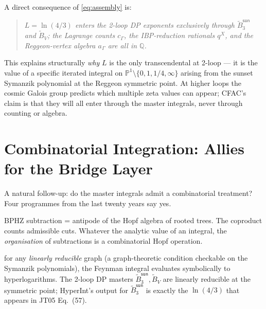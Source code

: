 \documentclass[11pt,a4paper]{article}
\newcommand{\Llog}{\ln(4/3)}
\theoremstyle{definition}
\theoremstyle{plain}
\begin{document}
\begin{cfacbox}[$\Llog$ is in the bridge layer only]
A direct consequence of \eqref{eq:assembly} is:
\begin{quote}
\emph{$L = \Llog$ enters the 2-loop DP exponents
exclusively through $\tilde B_3^{\textsf{sun}}$ and $\tilde B_V$;
the Lagrange counts $c_\Gamma$, the IBP-reduction rationals $q^X$,
and the Reggeon-vertex algebra $a_\Gamma$ are all in $\mathbb{Q}$.}
\end{quote}
This explains structurally \emph{why} $L$ is the only transcendental
at 2-loop --- it is the value of a specific iterated integral
\cite{Panzer2014} on $\mathbb{P}^1\setminus\{0,1,1/4,\infty\}$
arising from the sunset Symanzik polynomial at the Reggeon symmetric
point.  At higher loops the cosmic Galois group \cite{Brown2015}
predicts which multiple zeta values can appear; CFAC's claim is that
they will all enter through the master integrals, never through
counting or algebra.
\end{cfacbox}

\section{Combinatorial Integration: Allies for the Bridge Layer}
\label{sec:combinatorial-integration}

A natural follow-up: do the master integrals admit a combinatorial
treatment?  Four programmes from the last twenty years say yes.

\begin{acbox}
\cite{ConnesKreimer1998,Kreimer1997} BPHZ subtraction = antipode of
the Hopf algebra of rooted trees.  The coproduct counts admissible
cuts.  Whatever the analytic value of an integral, the
\emph{organisation} of subtractions is a combinatorial Hopf
operation.
\end{acbox}

\begin{acbox}
\cite{Panzer2014,Panzer2015,Brown2008} for any \emph{linearly
reducible} graph (a graph-theoretic condition checkable on the
Symanzik polynomials), the Feynman integral evaluates symbolically to
hyperlogarithms.  The 2-loop DP masters $\tilde B_3^{\textsf{sun}},
\tilde B_V$ are linearly reducible at the symmetric point;
HyperInt's output for $\tilde B_3^{\textsf{sun}}$ is exactly the
$\Llog$ that appears in JT05 Eq.~(57).
\end{acbox}
\end{document}
